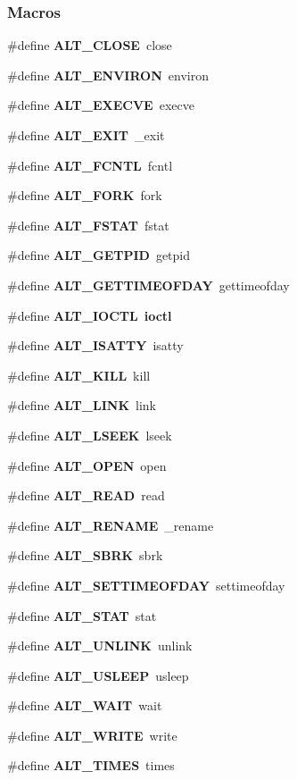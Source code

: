 \subsubsection*{Macros}
\begin{DoxyCompactItemize}
\item 
\#define {\bf A\+L\+T\+\_\+\+C\+L\+O\+SE}~close
\item 
\#define {\bf A\+L\+T\+\_\+\+E\+N\+V\+I\+R\+ON}~environ
\item 
\#define {\bf A\+L\+T\+\_\+\+E\+X\+E\+C\+VE}~execve
\item 
\#define {\bf A\+L\+T\+\_\+\+E\+X\+IT}~\+\_\+exit
\item 
\#define {\bf A\+L\+T\+\_\+\+F\+C\+N\+TL}~fcntl
\item 
\#define {\bf A\+L\+T\+\_\+\+F\+O\+RK}~fork
\item 
\#define {\bf A\+L\+T\+\_\+\+F\+S\+T\+AT}~fstat
\item 
\#define {\bf A\+L\+T\+\_\+\+G\+E\+T\+P\+ID}~getpid
\item 
\#define {\bf A\+L\+T\+\_\+\+G\+E\+T\+T\+I\+M\+E\+O\+F\+D\+AY}~gettimeofday
\item 
\#define {\bf A\+L\+T\+\_\+\+I\+O\+C\+TL}~{\bf ioctl}
\item 
\#define {\bf A\+L\+T\+\_\+\+I\+S\+A\+T\+TY}~isatty
\item 
\#define {\bf A\+L\+T\+\_\+\+K\+I\+LL}~kill
\item 
\#define {\bf A\+L\+T\+\_\+\+L\+I\+NK}~link
\item 
\#define {\bf A\+L\+T\+\_\+\+L\+S\+E\+EK}~lseek
\item 
\#define {\bf A\+L\+T\+\_\+\+O\+P\+EN}~open
\item 
\#define {\bf A\+L\+T\+\_\+\+R\+E\+AD}~read
\item 
\#define {\bf A\+L\+T\+\_\+\+R\+E\+N\+A\+ME}~\+\_\+rename
\item 
\#define {\bf A\+L\+T\+\_\+\+S\+B\+RK}~sbrk
\item 
\#define {\bf A\+L\+T\+\_\+\+S\+E\+T\+T\+I\+M\+E\+O\+F\+D\+AY}~settimeofday
\item 
\#define {\bf A\+L\+T\+\_\+\+S\+T\+AT}~stat
\item 
\#define {\bf A\+L\+T\+\_\+\+U\+N\+L\+I\+NK}~unlink
\item 
\#define {\bf A\+L\+T\+\_\+\+U\+S\+L\+E\+EP}~usleep
\item 
\#define {\bf A\+L\+T\+\_\+\+W\+A\+IT}~wait
\item 
\#define {\bf A\+L\+T\+\_\+\+W\+R\+I\+TE}~write
\item 
\#define {\bf A\+L\+T\+\_\+\+T\+I\+M\+ES}~times
\end{DoxyCompactItemize}


